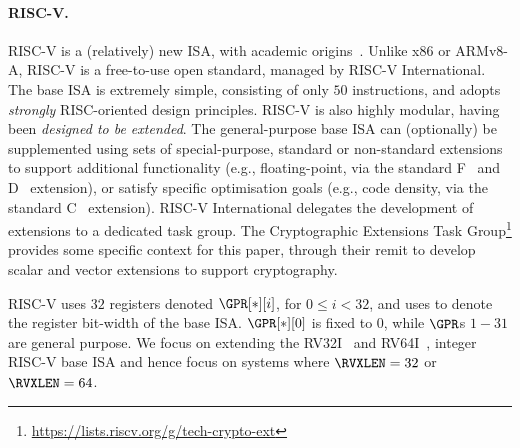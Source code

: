 
\paragraph{RISC-V.}
\label{sec:bg:riscv}

RISC-V is a (relatively) new ISA, with academic origins~\cite{riscv:1,riscv:2}.
Unlike x86 or ARMv8-A, RISC-V is a free-to-use 
open standard, managed by RISC-V International.
The base ISA is extremely simple, consisting of only $50$ instructions,
and adopts {\em strongly} RISC-oriented design principles.
RISC-V is also highly modular, having been {\em designed to be extended}.
The general-purpose base ISA can (optionally) be
supplemented using sets of special-purpose, standard or non-standard
extensions to
support additional functionality 
(e.g., floating-point, 
       via the 
       standard F~\cite[Section 11]{RV:ISA:I:19}
                and
                D~\cite[Section 12]{RV:ISA:I:19}
       extension),
or 
satisfy specific optimisation goals
(e.g., code density, 
       via the 
       standard C~\cite[Section 16]{RV:ISA:I:19}
       extension).
RISC-V International delegates the development of
extensions to a dedicated task group.
The Cryptographic Extensions Task
Group\footnote{
  \url{https://lists.riscv.org/g/tech-crypto-ext}
} provides some specific context for this paper, through their remit to 
develop scalar and vector extensions to support cryptography.

RISC-V uses $32$ registers
denoted $\GPR[*][ i ]$, for $0 \leq i < 32$,
and uses \RVXLEN to denote the register bit-width of the base ISA.
$
\GPR[*][ 0 ]
$
is fixed to $0$, while $\GPR$s $1-31$ are general purpose.
We focus on extending the
RV32I~\cite[Section 2]{RV:ISA:I:19}
and 
RV64I~\cite[Section 5]{RV:ISA:I:19},
integer RISC-V base ISA
and hence focus on systems where 
$\RVXLEN = 32$
or
$\RVXLEN = 64$.

